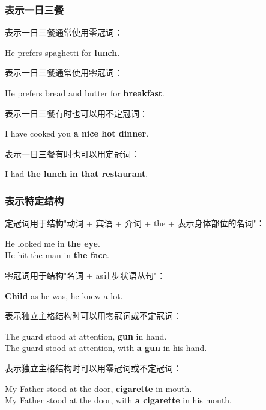 \documentclass[UTF8]{ctexart}
\newcommand{\littf}[1]{{\hspace{3pt}\ttfamily #1}}
\begin{document}
\subsubsection{表示一日三餐}
    表示一日三餐通常使用零冠词：
    \begin{center}
        \large\ttfamily
        He prefers spaghetti for \textbf{lunch}.\\[6mm]
    \end{center}
    表示一日三餐通常使用零冠词：
    \begin{center}
        \large\ttfamily
        He prefers bread and butter for \textbf{breakfast}.\\[6mm]
    \end{center}
    表示一日三餐有时也可以用不定冠词：
    \begin{center}
        \large\ttfamily
        I have cooked you \textbf{a nice hot dinner}.\\[6mm]
    \end{center}
    表示一日三餐有时也可以用定冠词：
    \begin{center}
        \large\ttfamily
        I had \textbf{the lunch in that restaurant}.
    \end{center}\vspace{5pt}

\subsubsection{表示特定结构}
    定冠词用于结构\littf{"\hspace{0pt}动词 + 宾语 + 介词 + the + 表示身体部位的名词"}：
    \begin{center}
        \large\ttfamily
        He looked me in \textbf{the eye}.\\[3mm]
        He hit the man in \textbf{the face}.\\[6mm]
    \end{center}
    零冠词用于结构\littf{"\hspace{0pt}名词 + as让步状语从句"}：
    \begin{center}
        \large\ttfamily
        \textbf{Child} as he was, he knew a lot.\\[6mm]
    \end{center}
    表示独立主格结构时可以用零冠词或不定冠词：
    \begin{center}
        \large\ttfamily
        The guard stood at attention, \textbf{gun} in hand.\\[3mm]
        The guard stood at attention, with \textbf{a gun} in his hand.\\[6mm]
    \end{center}
    表示独立主格结构时可以用零冠词或不定冠词：
    \begin{center}
        \large\ttfamily
        My Father stood at the door, \textbf{cigarette} in mouth.\\[3mm]
        My Father stood at the door, with \textbf{a cigarette} in his mouth.\\[6mm]
    \end{center}
\end{document}

